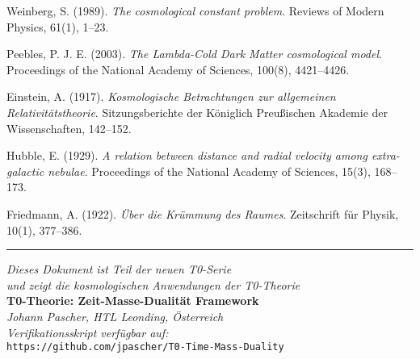 \documentclass[12pt,a4paper]{article}
\begin{document}
\begin{thebibliography}{30}
		Weinberg, S. (1989). 
		\textit{The cosmological constant problem}. 
		Reviews of Modern Physics, 61(1), 1--23.
		
		Peebles, P. J. E. (2003). 
		\textit{The Lambda-Cold Dark Matter cosmological model}. 
		Proceedings of the National Academy of Sciences, 100(8), 4421--4426.
		
		Einstein, A. (1917). 
		\textit{Kosmologische Betrachtungen zur allgemeinen Relativitätstheorie}. 
		Sitzungsberichte der Königlich Preußischen Akademie der Wissenschaften, 142--152.
		
		Hubble, E. (1929). 
		\textit{A relation between distance and radial velocity among extra-galactic nebulae}. 
		Proceedings of the National Academy of Sciences, 15(3), 168--173.
		
		Friedmann, A. (1922). 
		\textit{Über die Krümmung des Raumes}. 
		Zeitschrift für Physik, 10(1), 377--386.
		
	\end{thebibliography}
	
	\begin{center}
		\hrule
		\vspace{0.5cm}
		\textit{Dieses Dokument ist Teil der neuen T0-Serie}\\
		\textit{und zeigt die kosmologischen Anwendungen der T0-Theorie}\\
		\vspace{0.3cm}
		\textbf{T0-Theorie: Zeit-Masse-Dualität Framework}\\
		\textit{Johann Pascher, HTL Leonding, Österreich}\\
		\vspace{0.3cm}
		\textit{Verifikationsskript verfügbar auf:}\\
		\texttt{https://github.com/jpascher/T0-Time-Mass-Duality}
	\end{center}
	
\end{document}
